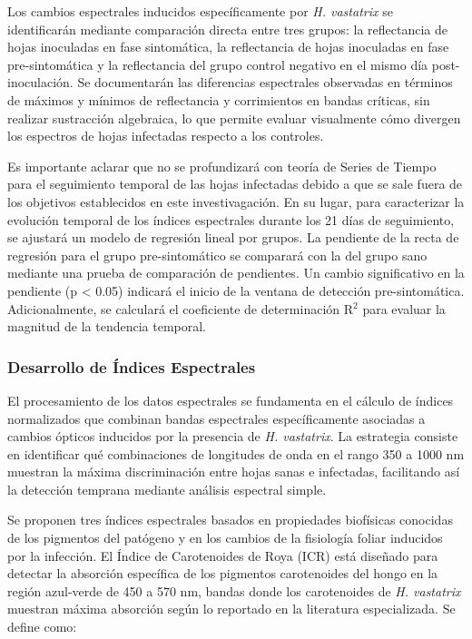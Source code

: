 \documentclass[12pt, a4paper]{article}
\begin{document}
	Los cambios espectrales inducidos específicamente por \textit{H. vastatrix} se identificarán mediante comparación directa entre tres grupos: la reflectancia de hojas inoculadas en fase sintomática, la reflectancia de hojas inoculadas en fase pre-sintomática y la reflectancia del grupo control negativo en el mismo día post-inoculación. Se documentarán las diferencias espectrales observadas en términos de máximos y mínimos de reflectancia y corrimientos en bandas críticas, sin realizar sustracción algebraica, lo que permite evaluar visualmente cómo divergen los espectros de hojas infectadas respecto a los controles.
	
	Es importante aclarar que no se profundizar\'a con teor\'ia de Series de Tiempo para el seguimiento temporal de las hojas infectadas debido a que se sale fuera de los objetivos establecidos en este investivagaci\'on. En su lugar, para caracterizar la evolución temporal de los índices espectrales durante los 21 días de seguimiento, se ajustará un modelo de regresión lineal por grupos. La pendiente de la recta de regresión para el grupo pre-sintomático se comparará con la del grupo sano mediante una prueba de comparación de pendientes. Un cambio significativo en la pendiente (p < 0.05) indicará el inicio de la ventana de detección pre-sintomática. Adicionalmente, se calculará el coeficiente de determinación R$^2$ para evaluar la magnitud de la tendencia temporal.
	
	\subsubsection{Desarrollo de Índices Espectrales}
	
	El procesamiento de los datos espectrales se fundamenta en el cálculo de índices normalizados que combinan bandas espectrales específicamente asociadas a cambios ópticos inducidos por la presencia de \textit{H. vastatrix}. La estrategia consiste en identificar qué combinaciones de longitudes de onda en el rango 350 a 1000 nm muestran la máxima discriminación entre hojas sanas e infectadas, facilitando así la detección temprana mediante análisis espectral simple.
	
	Se proponen tres índices espectrales basados en propiedades biofísicas conocidas de los pigmentos del patógeno y en los cambios de la fisiología foliar inducidos por la infección. El Índice de Carotenoides de Roya (ICR) está diseñado para detectar la absorción específica de los pigmentos carotenoides del hongo en la región azul-verde de 450 a 570 nm, bandas donde los carotenoides de \textit{H. vastatrix} muestran máxima absorción según lo reportado en la literatura especializada. Se define como:
	
\end{document}
